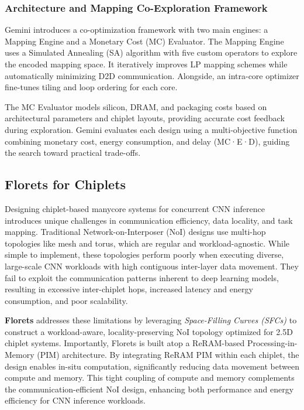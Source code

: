 \documentclass[acmsmall]{acmart}
\begin{document}
\subsubsection{Architecture and Mapping Co-Exploration Framework}
Gemini introduces a co-optimization framework with two main engines: a Mapping Engine and a Monetary Cost (MC) Evaluator. The Mapping Engine uses a Simulated Annealing (SA) algorithm with five custom operators to explore the encoded mapping space. It iteratively improves LP mapping schemes while automatically minimizing D2D communication. Alongside, an intra-core optimizer fine-tunes tiling and loop ordering for each core.

The MC Evaluator models silicon, DRAM, and packaging costs based on architectural parameters and chiplet layouts, providing accurate cost feedback during exploration. Gemini evaluates each design using a multi-objective function combining monetary cost, energy consumption, and delay (MC·E·D), guiding the search toward practical trade-offs.


\subsection{Florets for Chiplets}
Designing chiplet-based manycore systems for concurrent CNN inference introduces unique challenges in communication efficiency, data locality, and task mapping. Traditional Network-on-Interposer (NoI) designs use multi-hop topologies like mesh and torus, which are regular and workload-agnostic. While simple to implement, these topologies perform poorly when executing diverse, large-scale CNN workloads with high contiguous inter-layer data movement. They fail to exploit the communication patterns inherent to deep learning models, resulting in excessive inter-chiplet hops, increased latency and energy consumption, and poor scalability.

\textbf{Florets} addresses these limitations by leveraging \textit{Space-Filling Curves (SFCs)} to construct a workload-aware, locality-preserving NoI topology optimized for 2.5D chiplet systems. Importantly, Florets is built atop a ReRAM-based Processing-in-Memory (PIM) architecture. By integrating ReRAM PIM within each chiplet, the design enables in-situ computation, significantly reducing data movement between compute and memory. This tight coupling of compute and memory complements the communication-efficient NoI design, enhancing both performance and energy efficiency for CNN inference workloads.
\end{document}
